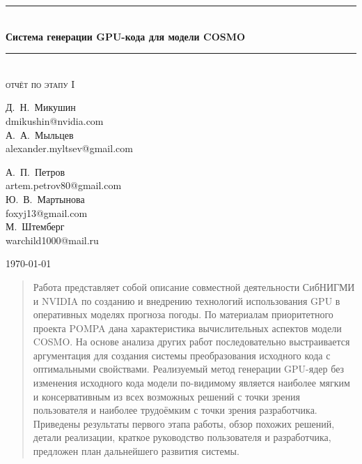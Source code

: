 \documentclass[a4,12pt]{report}
\newcommand{\HRule}{\rule{\linewidth}{0.5mm}}
\begin{document}
\begin{titlepage}
\begin{center}
\HRule \\[0.4cm]
{ \huge \bfseries Система генерации GPU-кода для модели COSMO}\\[0.4cm]

\HRule \\[0.5cm]

\textsc{\Large отчёт по этапу I}\\[1.5cm]


\begin{minipage}{0.4\textwidth}
\begin{flushleft} \large
Д.~Н.~Микушин \\
{\small dmikushin@nvidia.com} \\[0.5cm]
А.~А.~Мыльцев \\
{\small alexander.myltsev@gmail.com}
\end{flushleft}
\end{minipage}
\begin{minipage}{0.4\textwidth}
\begin{flushright} \large
А.~П.~Петров \\
{\small artem.petrov80@gmail.com} \\[0.5cm]
Ю.~В.~Мартынова \\
{\small foxyj13@gmail.com} \\[0.5cm]
М.~Штемберг \\
{\small warchild1000@mail.ru}
\end{flushright}
\end{minipage}

\vfill

{\large \today}

\end{center}

\end{titlepage}

\tableofcontents

\begin{abstract}
Работа представляет собой описание совместной деятельности СибНИГМИ и NVIDIA по созданию и внедрению технологий использования GPU в оперативных моделях прогноза погоды. По материалам приоритетного проекта POMPA дана характеристика вычислительных аспектов модели COSMO. На основе анализа других работ последовательно выстраивается аргументация для создания системы преобразования исходного кода с оптимальными свойствами. Реализуемый метод генерации GPU-ядер без изменения исходного кода модели по-видимому является наиболее мягким и консервативным из всех возможных решений с точки зрения пользователя и наиболее трудоёмким с точки зрения разработчика. Приведены результаты первого этапа работы, обзор похожих решений, детали реализации, краткое руководство пользователя и разработчика, предложен план дальнейшего развития системы.
\end{abstract}
\end{document}
